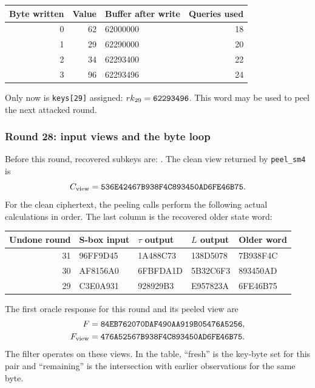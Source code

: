 \begin{center}\small\begin{tabular}{rrlr}\toprule
Byte written & Value & Buffer after write & Queries used\\\midrule
0 & 62 & 62000000 & 18\\
1 & 29 & 62290000 & 20\\
2 & 34 & 62293400 & 22\\
3 & 96 & 62293496 & 24\\
\bottomrule\end{tabular}\end{center}
Only now is \texttt{keys[29]} assigned: $rk_{29}=\texttt{62293496}$. This word may be used to peel the next attacked round.
\subsubsection*{Round 28: input views and the byte loop}
Before this round, recovered subkeys are:
.
The clean view returned by \texttt{peel\_sm4} is
\[C_{\rm view}=\texttt{536E42467B938F4C893450AD6FE46B75}.\]
For the clean ciphertext, the peeling calls perform the following actual calculations in order. The last column is the recovered older state word:
\begin{center}\small\begin{tabular}{rllll}\toprule
Undone round & S-box input & $\tau$ output & $L$ output & Older word\\\midrule
31 & 96FF9D45 & 1A488C73 & 138D5078 & 7B938F4C\\
30 & AF8156A0 & 6FBFDA1D & 5B32C6F3 & 893450AD\\
29 & C3E0A931 & 928929B3 & E957823A & 6FE46B75\\
\bottomrule\end{tabular}\end{center}
The first oracle response for this round and its peeled view are
\[\begin{aligned}F&=\texttt{84EB762070DAF490AA919B05476A5256},\\F_{\rm view}&=\texttt{476A52567B938F4C893450AD6FE46B75}.\end{aligned}\]
The filter operates on these views. In the table, ``fresh'' is the key-byte set for this pair and ``remaining'' is the intersection with earlier observations for the same byte.
